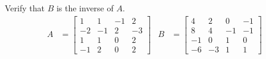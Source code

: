 Verify that $B$ is the inverse of $A$.
%
\begin{align*}
A&=
\begin{bmatrix}
1 & 1 & -1 & 2\\
-2 & -1 & 2 & -3\\
1 & 1 & 0 & 2\\
-1 & 2 & 0 & 2
\end{bmatrix}
&
B&=
\begin{bmatrix}
4 & 2 & 0 & -1\\
8 & 4 & -1 & -1\\
-1 & 0 & 1 & 0\\
-6 & -3 & 1 & 1
\end{bmatrix}
\end{align*}
%

